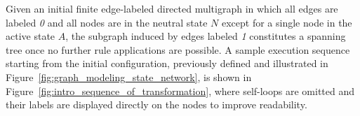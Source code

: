 Given an initial finite edge-labeled directed multigraph in which all edges are labeled \textit{0} and all nodes are in the neutral state $N$ except for a single node in the active state $A$, the subgraph induced by edges labeled \textit{1} constitutes a spanning tree once no further rule applications are possible. A sample execution sequence starting from the initial configuration, previously defined and illustrated in Figure~\ref{fig:graph_modeling_state_network}, is shown in Figure~\ref{fig:intro_sequence_of_transformation}, where self-loops are omitted and their labels are displayed directly on the nodes to improve readability. 

